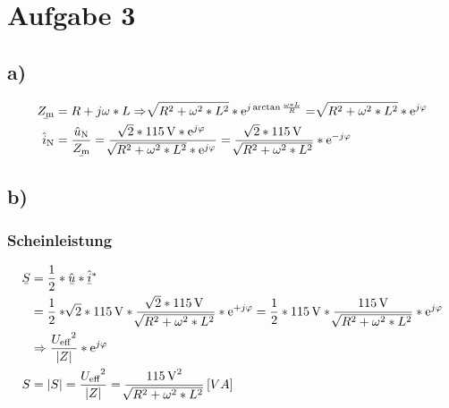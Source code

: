 \documentclass[../../document.tex]{subfiles}
\begin{document}
\section*{Aufgabe 3}

\subsection*{a)}

\begin{equation*}
    \begin{split}
        \ubar{Z\cind{m}} &= R + j \omega * L \Rightarrow \sqrt[]{R^2 + \omega^2 * L^2} * \upe^{j \arctan{\frac{\omega * L}{R}}} = \sqrt[]{R^2 + \omega^2 * L^2} * \upe^{j \varphi}\\
        \hat{i}\cind{N} &= \frac{\hat{u}\cind{N}}{\ubar{Z\cind{m}}} = \frac{\sqrt[]{2} * \SI{115}{\volt} * \upe^{j \varphi}}{\sqrt[]{R^2 + \omega^2 * L^2} * \upe^{j \varphi}} = \frac{\sqrt[]{2} * \SI{115}{\volt}}{\sqrt[]{R^2 + \omega^2 * L^2}} * \upe^{-j \varphi}\\
    \end{split}
\end{equation*}

\subsection*{b)}

\subsubsection*{Scheinleistung}

\begin{equation*}
    \begin{split}
        \ubar{S} &= \frac{1}{2} * \hat{\ubar{u}} * \hat{\ubar{i}}^*\\
        &= \frac{1}{2} * \sqrt[]{2} * \SI{115}{\volt} * \frac{\sqrt[]{2} * \SI{115}{\volt}}{\sqrt[]{R^2 + \omega^2 * L^2}} * \upe^{+j \varphi} = \frac{1}{2} * \SI{115}{\volt} * \frac{\SI{115}{\volt}}{\sqrt[]{R^2 + \omega^2 * L^2}} * \upe^{j \varphi}\\
        &\Rightarrow \frac{{U\cind{eff}}^2}{ \left\lvert Z \right\rvert } * \upe^{j \varphi}\\
        S &= \left\lvert S \right\rvert = \frac{{U\cind{eff}}^2}{ \left\lvert Z \right\rvert } = \frac{{\SI{115}{\volt}}^2}{ \sqrt[]{R^2 + \omega^2 * L^2 }} \left[VA\right]\\
    \end{split}
\end{equation*}
\end{document}
